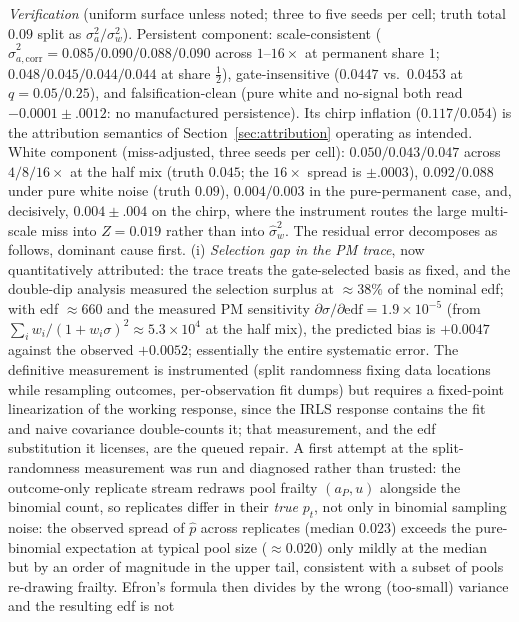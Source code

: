 \documentclass[11pt]{article}
\begin{document}
\emph{Verification} (uniform surface unless noted; three to five seeds per
cell; truth total $0.09$ split as $\sigma_a^2/\sigma_w^2$). Persistent
component: scale-consistent ($\hat\sigma_{a,\mathrm{corr}}^2 =
0.085/0.090/0.088/0.090$ across $1$--$16\times$ at permanent share $1$;
$0.048/0.045/0.044/0.044$ at share $\tfrac12$), gate-insensitive ($0.0447$
vs.\ $0.0453$ at $q=0.05/0.25$), and falsification-clean (pure white and
no-signal both read $-0.0001\pm.0012$: no manufactured persistence). Its
chirp inflation ($0.117/0.054$) is the attribution semantics of
Section~\ref{sec:attribution} operating as intended. White component
(miss-adjusted, three seeds per cell): $0.050/0.043/0.047$ across
$4/8/16\times$ at the half mix (truth $0.045$; the $16\times$ spread is
$\pm.0003$), $0.092/0.088$ under pure white noise (truth $0.09$),
$0.004/0.003$ in the pure-permanent case, and, decisively, $0.004\pm.004$
on the chirp, where the instrument routes the large multi-scale miss into
$Z=0.019$ rather than into $\hat\sigma_w^2$. The residual error decomposes as follows, dominant
cause first. (i) \emph{Selection gap in the PM trace}, now quantitatively
attributed: the trace treats the gate-selected basis as fixed, and the
double-dip analysis measured the selection surplus at $\approx38\%$ of the
nominal edf; with edf $\approx660$ and the measured PM sensitivity
$\partial\sigma/\partial\mathrm{edf} = 1.9\times10^{-5}$ (from
$\sum_i w_i/(1+w_i\sigma)^2 \approx 5.3\times10^4$ at the half mix), the
predicted bias is $+0.0047$ against the observed $+0.0052$; essentially the
entire systematic error. The definitive measurement is instrumented (split
randomness fixing data locations while resampling outcomes, per-observation
fit dumps) but requires a fixed-point linearization of the working response,
since the IRLS response contains the fit and naive covariance double-counts
it; that measurement, and the edf substitution it licenses, are the queued
repair. A first attempt at the split-randomness measurement was run and
diagnosed rather than trusted: the outcome-only replicate stream redraws
pool frailty $(a_P,u)$ alongside the binomial count, so replicates differ in
their \emph{true} $p_t$, not only in binomial sampling noise: the observed
spread of $\hat p$ across replicates (median $0.023$) exceeds the
pure-binomial expectation at typical pool size (${\approx}0.020$) only
mildly at the median but by an order of magnitude in the upper tail,
consistent with a subset of pools re-drawing frailty. Efron's formula then
divides by the wrong (too-small) variance and the resulting edf is not
\end{document}
